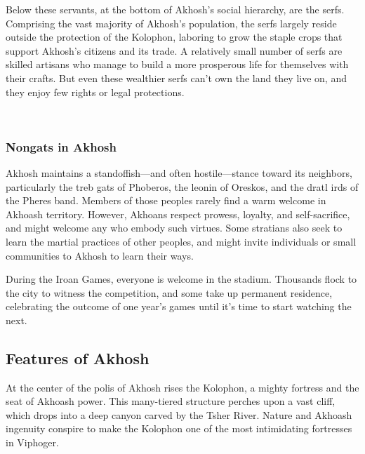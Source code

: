         Below these servants, at the bottom of Akhosh's social hierarchy, are the serfs.
        Comprising the vast majority of Akhosh's population, the serfs largely reside outside the protection of the Kolophon, laboring to grow the staple crops that support Akhosh's citizens and its trade.
        A relatively small number of serfs are skilled artisans who manage to build a more prosperous life for themselves with their crafts.
        But even these wealthier serfs can't own the land they live on, and they enjoy few rights or legal protections.

        \pagebreak~
        \vspace{12cm}

    \subsubsection{Nongats in Akhosh}
        Akhosh maintains a standoffish—and often hostile—stance toward its neighbors, particularly the treb gats of Phoberos, the leonin of Oreskos, and the dratl irds of the Pheres band.
        Members of those peoples rarely find a warm welcome in Akhoash territory.
        However, Akhoans respect prowess, loyalty, and self-sacrifice, and might welcome any who embody such virtues.
        Some stratians also seek to learn the martial practices of other peoples, and might invite individuals or small communities to Akhosh to learn their ways.

        During the Iroan Games, everyone is welcome in the stadium.
        Thousands flock to the city to witness the competition, and some take up permanent residence, celebrating the outcome of one year's games until it's time to start watching the next.

\subsection*{Features of Akhosh}
    At the center of the polis of Akhosh rises the Kolophon, a mighty fortress and the seat of Akhoash power.
    This many-tiered structure perches upon a vast cliff, which drops into a deep canyon carved by the Tsher River.
    Nature and Akhoash ingenuity conspire to make the Kolophon one of the most intimidating fortresses in Viphoger.

